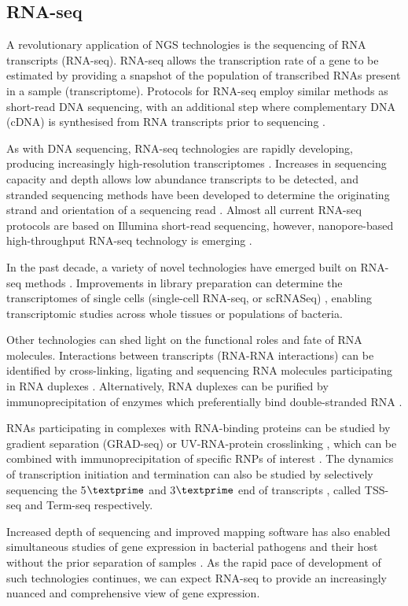 \subsection{RNA-seq}
A revolutionary application of NGS technologies is the sequencing of RNA transcripts (RNA-seq). RNA-seq allows the transcription rate of a gene to be estimated by providing a snapshot of the population of transcribed RNAs present in a sample (transcriptome). Protocols for RNA-seq employ similar methods as short-read DNA sequencing, with an additional step where complementary DNA (cDNA) is synthesised from RNA transcripts prior to sequencing \citep{Wang2009-ao}.\par
As with DNA sequencing, RNA-seq technologies are rapidly developing, producing increasingly high-resolution transcriptomes \citep{Creecy2015-is}. Increases in sequencing capacity and depth allows low abundance transcripts to be detected, and stranded sequencing methods have been developed to determine the originating strand and orientation of a sequencing read \citep{Parkhomchuk2009-xj,Fullwood2009-wu}. Almost all current RNA-seq protocols are based on Illumina short-read sequencing, however, nanopore-based high-throughput RNA-seq technology is emerging \citep{Workman2018-bo}.\par
In the past decade, a variety of novel technologies have emerged built on RNA-seq methods \citep{Saliba2017-ax,Hrdlickova2017-ty}. Improvements in library preparation can determine the transcriptomes of single cells (single-cell RNA-seq, or scRNASeq) \citep{Islam2014-rx}, enabling transcriptomic studies across whole tissues or populations of bacteria.\par
Other technologies can shed light on the functional roles and fate of RNA molecules. Interactions between transcripts (RNA-RNA interactions) can be identified by cross-linking, ligating and sequencing RNA molecules participating in RNA duplexes \citep{Kudla2011-xi}. Alternatively, RNA duplexes can be purified by immunoprecipitation of enzymes which preferentially bind double-stranded RNA \citep{Lioliou2013-if}.\par
RNAs participating in complexes with RNA-binding proteins can be studied by gradient separation (GRAD-seq) \citep{Rederstorff2010-dr,Smirnov2016-yt} or UV-RNA-protein crosslinking \citep{Licatalosi2008-cm}, which can be combined with immunoprecipitation of specific RNPs of interest \citep{Zhao2010-nu,Lu2014-cg,Melamed2016-xv}. The dynamics of transcription initiation and termination can also be studied by selectively sequencing the 5$\textprime$  \citep{Sharma2010-lv} and 3$\textprime$  end of transcripts \citep{Dar2016-vm}, called TSS-seq and Term-seq respectively. \par
Increased depth of sequencing and improved mapping software has also enabled simultaneous studies of gene expression in bacterial pathogens and their host without the prior separation of samples \citep{Westermann2012-pr}. As the rapid pace of development of such technologies continues, we can expect RNA-seq to provide an increasingly nuanced and comprehensive view of gene expression.\par

